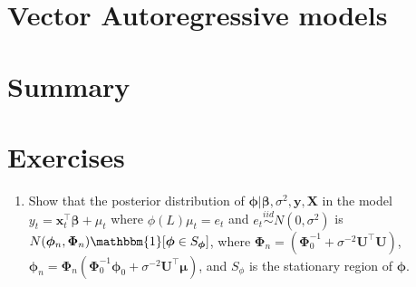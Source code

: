 \section{Vector Autoregressive models}\label{sec85}

\section{Summary}\label{sec86}

\section{Exercises}\label{sec87}

\begin{enumerate}
	\item Show that the posterior distribution of $\bm{\phi}|\bm{\beta},\sigma^2,\bm{y},\bm{X}$ in the model $y_t=\bm{x}_t^{\top}\bm{\beta}+\mu_t$ where $\phi(L)\mu_t=e_t$ and $e_t\stackrel{iid}{\sim}N(0,\sigma^2)$ is $N(\bm{\phi}_n, \bm{\Phi}_n)\mathbbm{1}[\bm{\phi}\in S_{\bm{\phi}}]$, where $\bm{\Phi}_n=(\bm{\Phi}_0^{-1}+\sigma^{-2}\bm{U}^{\top}\bm{U})$, $\bm{\phi}_n=\bm{\Phi}_n(\bm{\Phi}_0^{-1}\bm{\phi}_0+\sigma^{-2}\bm{U}^{\top}\bm{\mu})$, and $S_{\phi}$ is the stationary region of $\bm{\phi}$.
	
	
\end{enumerate}
